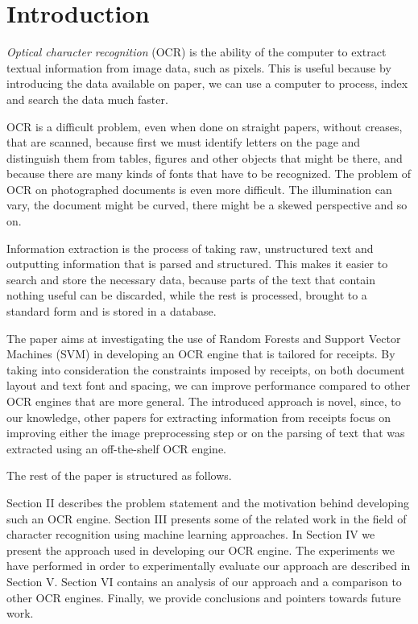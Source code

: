 \section{Introduction}
\textit{Optical character recognition} (OCR) is the ability of the computer to extract textual information from image data, such as pixels\cite{schantz1982history}. This is useful because by introducing the data available on paper, we can use a computer to process, index and search the data much faster.  

OCR is a difficult problem, even when done on straight papers, without creases, that are scanned, because first we must identify letters on the page and distinguish them from tables, figures and other objects that might be there, and because there are many kinds of fonts that have to be recognized. The problem of OCR on photographed documents is even more difficult. The illumination can vary, the document might be curved, there might be a skewed perspective and so on. 

Information extraction is the process of taking raw, unstructured text and outputting information that is parsed and structured. This makes it easier to search and store the necessary data, because parts of the text that contain nothing useful can be discarded, while the rest is processed, brought to a standard form and is stored in a database. 

The paper aims at investigating the use of Random Forests\cite{breiman2001random} and Support Vector Machines (SVM)\cite{Cortes_1995} in developing an OCR engine that is tailored for receipts. By taking into consideration the constraints imposed by receipts, on both document layout and text font and spacing, we can improve performance compared to other OCR engines that are more general. The introduced approach is novel, since, to our knowledge, other papers for extracting information from receipts focus on improving either the image preprocessing step or on the parsing of text that was extracted using an off-the-shelf OCR engine.

The rest of the paper is structured as follows.

Section II describes the problem statement and the motivation behind developing such an OCR engine. Section III presents some of the related work in the field of character recognition using machine learning approaches. In Section IV we present the approach used in developing our OCR engine. The experiments we have performed in order to experimentally evaluate our approach are described in Section V. Section VI contains an analysis of our approach and a comparison to other OCR engines. Finally, we provide conclusions and pointers towards future work. 
